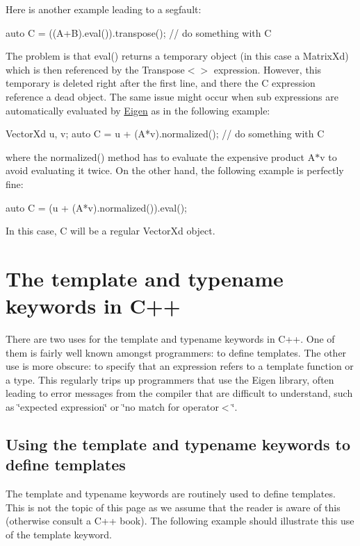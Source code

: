 Here is another example leading to a segfault\+: 
\begin{DoxyCode}
\textcolor{keyword}{auto} C = ((A+B).eval()).transpose();
\textcolor{comment}{// do something with C}
\end{DoxyCode}
 The problem is that eval() returns a temporary object (in this case a Matrix\+Xd) which is then referenced by the Transpose$<$$>$ expression. However, this temporary is deleted right after the first line, and there the C expression reference a dead object. The same issue might occur when sub expressions are automatically evaluated by \hyperlink{namespace_eigen}{Eigen} as in the following example\+: 
\begin{DoxyCode}
VectorXd u, v;
\textcolor{keyword}{auto} C = u + (A*v).normalized();
\textcolor{comment}{// do something with C}
\end{DoxyCode}
 where the normalized() method has to evaluate the expensive product A$\ast$v to avoid evaluating it twice. On the other hand, the following example is perfectly fine\+: 
\begin{DoxyCode}
\textcolor{keyword}{auto} C = (u + (A*v).normalized()).eval();
\end{DoxyCode}
 In this case, C will be a regular Vector\+Xd object. \hypertarget{TopicTemplateKeyword}{}\section{The template and typename keywords in C++}\label{TopicTemplateKeyword}
There are two uses for the {\ttfamily template} and {\ttfamily typename} keywords in C++. One of them is fairly well known amongst programmers\+: to define templates. The other use is more obscure\+: to specify that an expression refers to a template function or a type. This regularly trips up programmers that use the Eigen library, often leading to error messages from the compiler that are difficult to understand, such as \char`\"{}expected expression\char`\"{} or \char`\"{}no match for operator$<$\char`\"{}.\hypertarget{_topic_template_keyword_TopicTemplateKeywordToDefineTemplates}{}\subsection{Using the template and typename keywords to define templates}\label{_topic_template_keyword_TopicTemplateKeywordToDefineTemplates}
The {\ttfamily template} and {\ttfamily typename} keywords are routinely used to define templates. This is not the topic of this page as we assume that the reader is aware of this (otherwise consult a C++ book). The following example should illustrate this use of the {\ttfamily template} keyword.


